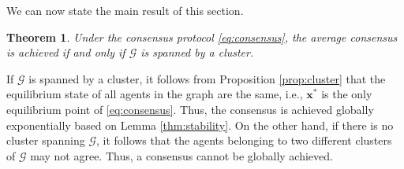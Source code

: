 \documentclass[draftclsnofoot,11pt,onecolumn]{IEEEtran}
\newtheorem{Theorem}{Theorem}
\newcommand{\m}[1]{\mathbf{#1}}
\newcommand{\mc}[1]{\mathcal{#1}}
\begin{document}
We can now state the main result of this section.
\begin{Theorem} \label{thm:alg_graph_condition} Under the consensus protocol \eqref{eq:consensus}, the average consensus is achieved if and only if $\mc{G}$ is spanned by a cluster.
\end{Theorem}
\begin{IEEEproof}
If $\mc{G}$ is spanned by a cluster, it follows from Proposition \ref{prop:cluster} that the equilibrium state of all agents in the graph are the same, i.e., $\m{x}^*$ is the only equilibrium point of \eqref{eq:consensus}. Thus, the consensus is achieved globally exponentially  based on Lemma \ref{thm:stability}. On the other hand, if there is no cluster spanning $\mc{G}$, it follows that the agents belonging to two different clusters of $\mc{G}$ may not agree. Thus, a consensus cannot be globally achieved.
\end{IEEEproof}
\end{document}
